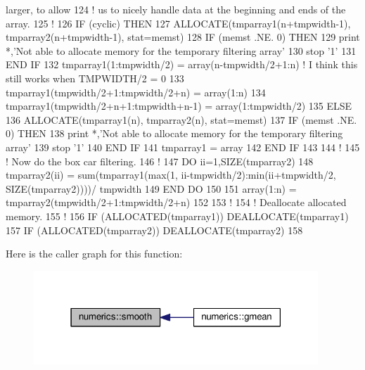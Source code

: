 \begin{DoxyCode}
{       larger, to allow}
124 \textcolor{comment}{! us to nicely handle data at the beginning and ends of the array.}
125 \textcolor{comment}{!}
126 \textcolor{keywordflow}{IF} (cyclic) \textcolor{keywordflow}{THEN}
127     \textcolor{keyword}{ALLOCATE}(tmparray1(n+tmpwidth-1), tmparray2(n+tmpwidth-1), stat=memst)
128     \textcolor{keywordflow}{IF} (memst .NE. 0) \textcolor{keywordflow}{THEN}
129         print *,\textcolor{stringliteral}{'Not able to allocate memory for the temporary filtering array'}
130         stop \textcolor{stringliteral}{'1'}
131 \textcolor{keywordflow}{    END IF}
132     tmparray1(1:tmpwidth/2)                  = array(n-tmpwidth/2+1:n)   \textcolor{comment}{! I think this still works when
       TMPWIDTH/2 = 0}
133     tmparray1(tmpwidth/2+1:tmpwidth/2+n)     = array(1:n)
134     tmparray1(tmpwidth/2+n+1:tmpwidth+n-1)   = array(1:tmpwidth/2)
135 \textcolor{keywordflow}{ELSE}
136     \textcolor{keyword}{ALLOCATE}(tmparray1(n), tmparray2(n), stat=memst)
137     \textcolor{keywordflow}{IF} (memst .NE. 0) \textcolor{keywordflow}{THEN}
138         print *,\textcolor{stringliteral}{'Not able to allocate memory for the temporary filtering array'}
139         stop \textcolor{stringliteral}{'1'}
140 \textcolor{keywordflow}{    END IF}
141     tmparray1    = array
142 \textcolor{keywordflow}{END IF}
143 
144 \textcolor{comment}{!}
145 \textcolor{comment}{! Now do the box car filtering.}
146 \textcolor{comment}{!}
147 \textcolor{keywordflow}{DO} ii=1,\textcolor{keyword}{SIZE}(tmparray2)
148         tmparray2(ii)   = sum(tmparray1(max(1, ii-tmpwidth/2):min(ii+tmpwidth/2, \textcolor{keyword}{SIZE}(tmparray2))))/
      tmpwidth
149 \textcolor{keywordflow}{END DO}
150 
151 array(1:n)  = tmparray2(tmpwidth/2+1:tmpwidth/2+n)
152 
153 \textcolor{comment}{!}
154 \textcolor{comment}{! Deallocate allocated memory.}
155 \textcolor{comment}{!}
156 \textcolor{keywordflow}{IF} (\textcolor{keyword}{ALLOCATED}(tmparray1))    \textcolor{keyword}{DEALLOCATE}(tmparray1)
157 \textcolor{keywordflow}{IF} (\textcolor{keyword}{ALLOCATED}(tmparray2))    \textcolor{keyword}{DEALLOCATE}(tmparray2)
158 
\end{DoxyCode}


Here is the caller graph for this function\+:\nopagebreak
\begin{figure}[H]
\begin{center}
\leavevmode
\includegraphics[width=303pt]{namespacenumerics_a354d8c793bd1515de7af7cfa32c51389_icgraph}
\end{center}
\end{figure}


